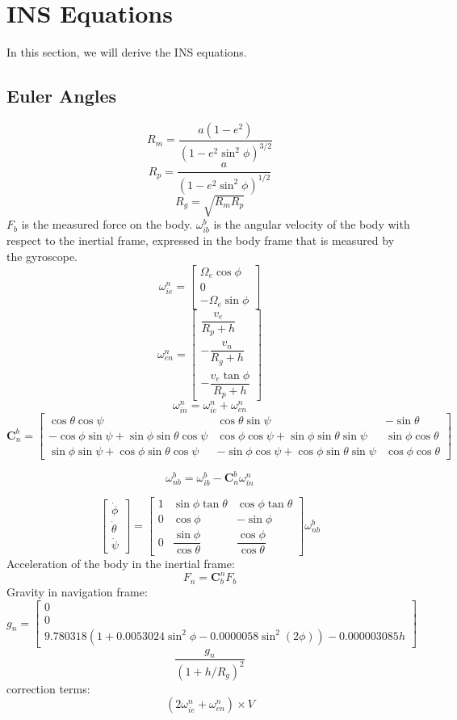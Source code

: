\section{INS Equations}
In this section, we will derive the INS equations.
\subsection{Euler Angles}
\[
R_m = \dfrac{a(1-e^2)}{(1-e^2\sin^2\phi)^{3/2}}
\]
\[
    R_p = \dfrac{a}{(1-e^2\sin^2\phi)^{1/2}}
\]
\[
    R_g = \sqrt{R_m R_p}
\]
$F_b$ is the measured force on the body.
$\omega_{ib}^b$ is the angular velocity of the body with respect to the inertial frame, expressed in the body frame that is measured by the gyroscope.
\[
    \omega_{ie}^n = \begin{bmatrix}
        \Omega_e \cos\phi \\
        0 \\
        -\Omega_e \sin\phi
    \end{bmatrix}
\]
\[
    \omega_{en}^n = \begin{bmatrix}
        \dfrac{v_e}{R_p+h} \\[1em]
        -\dfrac{v_n}{R_g+h} \\[1em]
        -\dfrac{v_e\tan\phi}{R_p+h}
    \end{bmatrix}
\]
\[
    \omega_{in}^n = \omega_{ie}^n + \omega_{en}^n
\]
\[
    \bm{C}_n^b = \begin{bmatrix}
        \cos\theta\cos\psi & \cos\theta\sin\psi & -\sin\theta \\
        -\cos\phi\sin\psi+\sin\phi\sin\theta\cos\psi & \cos\phi\cos\psi+\sin\phi\sin\theta\sin\psi & \sin\phi\cos\theta \\
        \sin\phi\sin\psi+\cos\phi\sin\theta\cos\psi & -\sin\phi\cos\psi+\cos\phi\sin\theta\sin\psi & \cos\phi\cos\theta
    \end{bmatrix}
\]

\[
    \omega_{nb}^b = \omega_{ib}^b - \bm{C}_n^b \omega_{in}^n
\]

\[
    \begin{bmatrix}
        \dot{\phi} \\
        \dot{\theta} \\
        \dot{\psi}
    \end{bmatrix} = \begin{bmatrix}
        1 & \sin\phi\tan\theta & \cos\phi\tan\theta \\
        0 & \cos\phi & -\sin\phi \\
        0 & \dfrac{\sin\phi}{\cos\theta} & \dfrac{\cos\phi}{\cos\theta}
    \end{bmatrix} \omega_{nb}^b
\]
Acceleration of the body in the inertial frame:
\[
    F_n = \bm{C}_b^n F_b
\]
Gravity in navigation frame:
\[
    g_n = \begin{bmatrix}
        0 \\
        0 \\
        9.780318(1+0.0053024\sin^2\phi-0.0000058\sin^2(2\phi)) - 0.000003085h
    \end{bmatrix}
\]
\[
    \dfrac{g_n}{(1 + h/R_g)^2} 
\]
correction terms:
\[
    (2\omega_{ie}^n + \omega_{en}^n) \times V
\]

